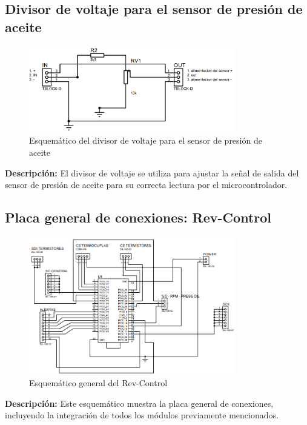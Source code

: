 \subsection{Divisor de voltaje para el sensor de presión de aceite}
\begin{figure}[H]
    \centering
    \includegraphics[width=0.8\textwidth]{Imagenes/Divisor de voltaje para presion de aceite.png}
    \caption{Esquemático del divisor de voltaje para el sensor de presión de aceite}
    \label{fig:divisor_presion}
\end{figure}
\textbf{Descripción:} El divisor de voltaje se utiliza para ajustar la señal de salida del sensor de presión de aceite para su correcta lectura por el microcontrolador.

\subsection{Placa general de conexiones: Rev-Control}
\begin{figure}[H]
    \centering
    \includegraphics[width=0.8\textwidth]{Imagenes/Placa rev control.png}
    \caption{Esquemático general del Rev-Control}
    \label{fig:rev_control}
\end{figure}
\textbf{Descripción:} Este esquemático muestra la placa general de conexiones, incluyendo la integración de todos los módulos previamente mencionados.

